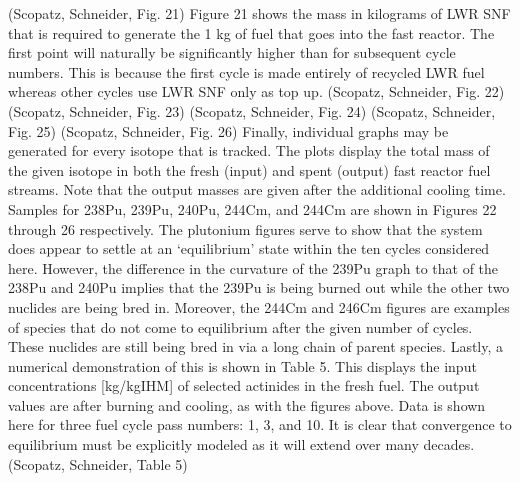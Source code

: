 (Scopatz, Schneider, Fig. 21)
Figure 21 shows the mass in kilograms of LWR SNF that is required to generate the 1 kg of fuel that goes into the fast reactor. The first point will naturally be significantly higher than for subsequent cycle numbers.  This is because the first cycle is made entirely of recycled LWR fuel whereas other cycles use LWR SNF only as top up.  
 (Scopatz, Schneider, Fig. 22)
(Scopatz, Schneider, Fig. 23)
(Scopatz, Schneider, Fig. 24)
(Scopatz, Schneider, Fig. 25)
(Scopatz, Schneider, Fig. 26)
Finally, individual graphs may be generated for every isotope that is tracked.  The plots display the total mass of the given isotope in both the fresh (input) and spent (output) fast reactor fuel streams.  Note that the output masses are given after the additional cooling time.  Samples for 238Pu, 239Pu, 240Pu, 244Cm, and 244Cm are shown in Figures 22 through 26 respectively.  The plutonium figures serve to show that the system does appear to settle at an ‘equilibrium’ state within the ten cycles considered here.  However, the difference in the curvature of the 239Pu graph to that of the 238Pu and 240Pu implies that the 239Pu is being burned out while the other two nuclides are being bred in.  Moreover, the 244Cm and 246Cm figures are examples of species that do not come to equilibrium after the given number of cycles.  These nuclides are still being bred in via a long chain of parent species.  
Lastly, a numerical demonstration of this is shown in Table 5.  This displays the input concentrations [kg/kgIHM] of selected actinides in the fresh fuel.  The output values are after burning and cooling, as with the figures above.  Data is shown here for three fuel cycle pass numbers: 1, 3, and 10.  It is clear that convergence to equilibrium must be explicitly modeled as it will extend over many decades.
(Scopatz, Schneider, Table 5)





